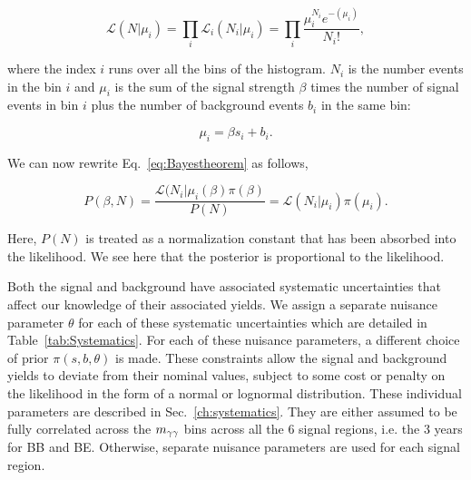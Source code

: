\begin{equation} \label{eq:poisson_likelihood}
\mathcal{L}(N| \mu_i ) = \prod_{i} \mathcal{L}_{i}(N_i | \mu_i ) = \prod_{i} \frac{\mu_i^{N_i} e^{-(\mu_i)}}{N_i!},
\end{equation}

where the index $i$ runs over all the bins of the histogram. $N_i$ is the number events in the bin $i$ and $\mu_i$ is the sum of the signal strength $
\beta$ times the number of signal events in bin $i$ plus the number of background events $b_i$ in the same bin:

\begin{equation} \label{eq:splusb}
\mu_i = \beta s_{i} + b_i.
\end{equation}

We can now rewrite Eq.~\ref{eq:Bayestheorem} as follows,

\begin{equation} \label{eq:posterior}
P(\beta, N) = \frac{\mathcal{L}(N_i| \mu_{i} (\beta) \pi(\beta)}{P(N)} = \mathcal{L}(N_i| \mu_i) \pi(\mu_i).
\end{equation}

Here, $P(N)$ is treated as a normalization constant that has been absorbed into the likelihood. We see here that the posterior is proportional to the likelihood.

Both the signal and background have associated systematic uncertainties that affect our knowledge of their associated yields. We assign a separate nuisance parameter $\theta$ for each of these systematic uncertainties which are detailed in Table~\ref{tab:Systematics}. For each of these nuisance parameters, a different choice of prior $\pi(s,b, \theta)$ is made. These constraints allow the signal and background yields to deviate from their nominal values, subject to some cost or penalty on the likelihood in the form of a normal or lognormal distribution. These  individual parameters are described in Sec.~\ref{ch:systematics}. They are either assumed to be fully correlated across the $m_{\gamma\gamma}$ bins across all the 6 signal regions, i.e. the 3 years for BB and BE. Otherwise, separate nuisance parameters are used for each signal region. 

